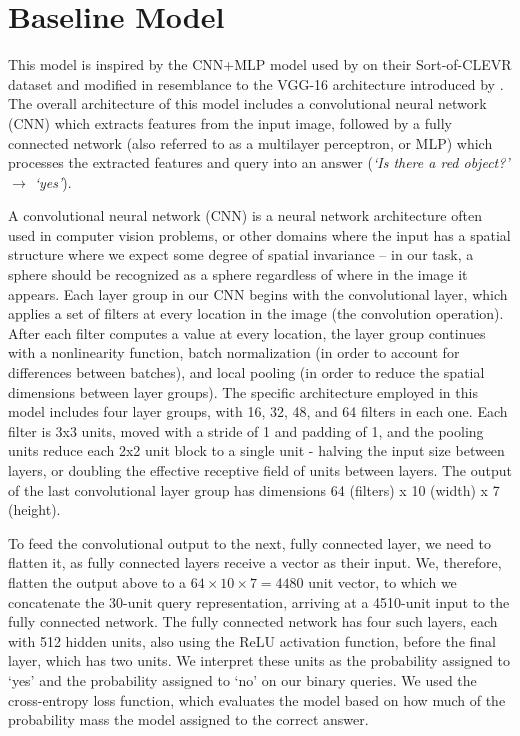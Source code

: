 \section{Baseline Model}
This model is inspired by the CNN+MLP model used by \textcite{Santoro} on their Sort-of-CLEVR dataset and modified in resemblance to the VGG-16 architecture introduced by \textcite{Simonyan2014}. The overall architecture of this model includes a convolutional neural network (CNN) which extracts features from the input image, followed by a fully connected network (also referred to as a multilayer perceptron, or MLP) which processes the extracted features and query into an answer (\textit{`Is there a red object?' $\to$  `yes'}). 

A convolutional neural network (CNN) is a neural network architecture often used in computer vision problems, or other domains where the input has a spatial structure where we expect some degree of spatial invariance -- in our task, a sphere should be recognized as a sphere regardless of where in the image it appears. Each layer group in our CNN begins with the convolutional layer, which applies a set of filters at every location in the image (the convolution operation). After each filter computes a value at every location, the layer group continues with a nonlinearity function, batch normalization (in order to account for differences between batches), and local pooling (in order to reduce the spatial dimensions between layer groups). The specific architecture employed in this model includes four layer groups, with 16, 32, 48, and 64 filters in each one. Each filter is 3x3 units, moved with a stride of 1 and padding of 1, and the pooling units reduce each 2x2 unit block to a single unit - halving the input size between layers, or doubling the effective receptive field of units between layers. The output of the last convolutional layer group has dimensions 64 (filters) x 10 (width) x 7 (height). 

To feed the convolutional output to the next, fully connected layer, we need to flatten it, as fully connected layers receive a vector as their input. We, therefore, flatten the output above to a $64 \times 10 \times 7 = 4480$ unit vector, to which we concatenate the 30-unit query representation, arriving at a 4510-unit input to the fully connected network. The fully connected network has four such layers, each with 512 hidden units, also using the ReLU activation function, before the final layer, which has two units. We interpret these units as the probability assigned to `yes' and the probability assigned to `no’ on our binary queries. We used the cross-entropy loss function, which evaluates the model based on how much of the probability mass the model assigned to the correct answer. 

